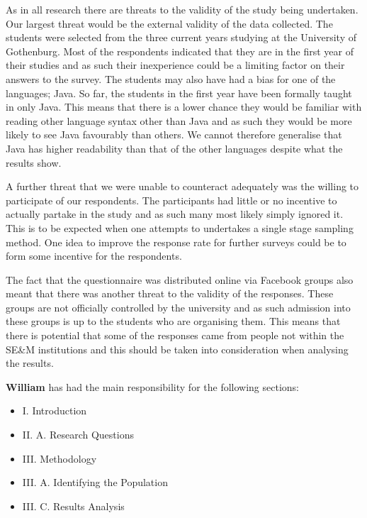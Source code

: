 \documentclass[times, 10pt,twocolumn]{Article}
\begin{document}
As in all research there are threats to the validity of the study being undertaken. Our largest threat would be the external validity of the data collected. The students were selected from the three current years studying at the University of Gothenburg. Most of the respondents indicated that they are in the first year of their studies and as such their inexperience could be a limiting factor on their answers to the survey. The students may also have had a bias for one of the languages; Java. So far, the students in the first year have been formally taught in only Java. This means that there is a lower chance they would be familiar with reading other language syntax other than Java and as such they would be more likely to see Java favourably than others. We cannot therefore generalise that Java has higher readability than that of the other languages despite what the results show. 

A further threat that we were unable to counteract adequately was the willing to participate of our respondents. The participants had little or no incentive to actually partake in the study and as such many most likely simply ignored it. This is to be expected when one attempts to undertakes a single stage sampling method. One idea to improve the response rate for further surveys could be to form some incentive for the respondents.

The fact that the questionnaire was distributed online via Facebook groups also meant that there was another threat to the validity of the responses. These groups are not officially controlled by the university and as such admission into these groups is up to the students who are organising them. This means that there is potential that some of the responses came from people not within the SE\&M institutions and this should be taken into consideration when analysing the results.





\vfill
\eject


\textbf{William} has had the main responsibility for the following sections:
\begin{itemize} \renewcommand{\labelitemi}{$\bullet$} 
\item I. Introduction
\item II. A. Research Questions
\item III. Methodology
\item III. A. Identifying the Population
\item III. C. Results Analysis
\end{itemize}
\ 
\end{document}
